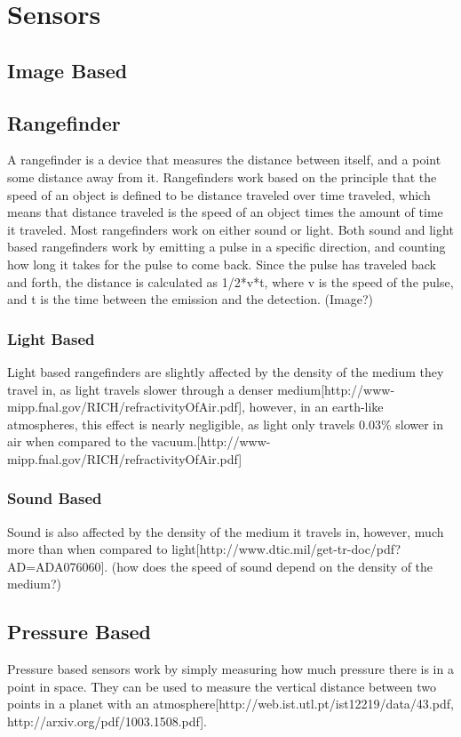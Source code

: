 \clearpage
\section{Sensors}

\subsection{Image Based}
\subsection{Rangefinder}
A rangefinder is a device that measures the distance between itself, and a point some distance away from it. Rangefinders work based on the principle that the speed of an object is defined to be distance traveled over time traveled, which means that distance traveled is the speed of an object times the amount of time it traveled. Most rangefinders work on either sound or light. Both sound and light based rangefinders work by emitting a pulse in a specific direction, and counting how long it takes for the pulse to come back. Since the pulse has traveled back and forth, the distance is calculated as {1/2*v*t}, where {v} is the speed of the pulse, and {t} is the time between the emission and the detection.
(Image?)
\subsubsection{Light Based}
Light based rangefinders are slightly affected by the density of the medium they travel in, as light travels slower through a denser medium[http://www-mipp.fnal.gov/RICH/refractivityOfAir.pdf], however, in an earth-like atmospheres, this effect is nearly negligible, as light only travels 0.03\% slower in air when compared to the vacuum.[http://www-mipp.fnal.gov/RICH/refractivityOfAir.pdf] %
\subsubsection{Sound Based}
Sound is also affected by the density of the medium it travels in, however, much more than when compared to light[http://www.dtic.mil/get-tr-doc/pdf?AD=ADA076060]. (how does the speed of sound depend on the density of the medium?)
\subsection{Pressure Based}
Pressure based sensors work by simply measuring how much pressure there is in a point in space. They can be used to measure the vertical distance between two points in a planet with an atmosphere[http://web.ist.utl.pt/ist12219/data/43.pdf, http://arxiv.org/pdf/1003.1508.pdf].
